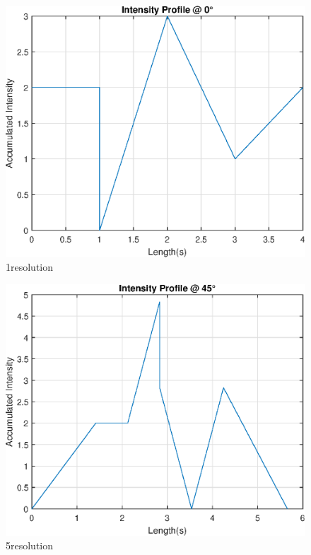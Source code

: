 \begin{figure}[htb!]
  \centering
  \includegraphics[width=\linewidth]{homework1/img/6.eps}
  \caption{1\textdegree resolution}
  \label{fig:recon_1deg}
\end{figure}
\begin{figure}[htb!]
  \centering
  \includegraphics[width=\linewidth]{homework1/img/5.eps}
  \caption{5\textdegree resolution}
  \label{fig:recon_5deg}
\end{figure}

